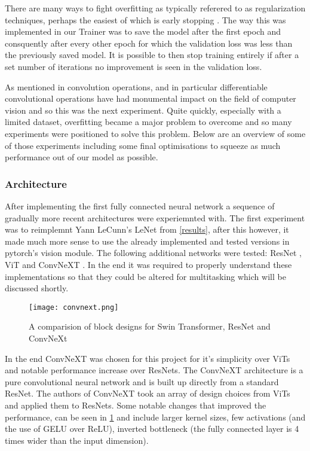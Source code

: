 There are many ways to fight overfitting as typically referered to as regularization techniques, perhaps the easiest of which is early stopping \cite{yao2007early}.
The way this was implemented in our Trainer was to save the model after the first epoch and consquently after every other epoch for which the validation 
loss was less than the previously saved model.  It is possible to then stop training entirely if after a set number of iterations no improvement is seen 
in the validation loss.

As mentioned in  convolution operations, and in particular differentiable convolutional operations have had monumental 
impact on the field of computer vision and so this was the next experiment. Quite quickly, especially with a limited dataset, overfitting 
became a major problem to overcome and so many experiments were positioned to solve this problem.  Below are an overview of some of those 
experiments including some final optimisations to squeeze as much performance out of our model as possible.


\subsubsection{Architecture}
After implementing the first fully connected neural network a sequence of gradually more recent architectures were experiemnted with.
The first experiment was to reimplemnt Yann LeCunn's LeNet from \ref{results}, after this however, it made much more sense to use the already implemented 
and tested versions in pytorch's vision module.  The following additional networks were tested: ResNet \cite{he2016deep}, ViT \cite{ViT} and ConvNeXT \cite{liu2022convnet}.  
In the end it was required to properly understand these implementations so that they could be altered for multitasking which will be discussed shortly.

\begin{figure}[h]
    \centering
    \texttt{[image: convnext.png]}
    \caption{A comparision of block designs for Swin Transformer, ResNet and ConvNeXt}
    \label{fig:convnext}
\end{figure}

In the end ConvNeXT was chosen for this project for it's simplicity over ViTs and notable performance increase over ResNets.  The ConvNeXT architecture is a pure 
convolutional neural network and is built up directly from a standard ResNet.  
The authors of ConvNeXT took an array of design choices from ViTs and applied them to ResNets.  
Some notable changes that improved the performance, can be seen in \ref{fig:convnext} and include
larger kernel sizes, few activations (and the use of GELU over ReLU), inverted bottleneck (the fully connected layer is 4 times wider than the input dimension).

